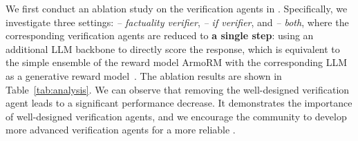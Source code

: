 \begin{table}
    \centering
    \small
    \caption{Experimental results (\%) of ablation study and the oracle setting. \textit{-- factuality verifier} and \textit{-- if verifier} refer to the reduction of the corresponding verification agent into a single LLM scorer.
    The results are the micro-averaged scores of all the corresponding subsets.}
    \label{tab:analysis}
\end{table}

We first conduct an ablation study on the verification agents in \ourmethod. Specifically, we investigate three settings: \textit{-- factuality verifier}, \textit{-- if verifier}, and \textit{-- both}, where the corresponding verification agents are reduced to \textbf{a single step}: using an additional LLM backbone to directly score the response, which is equivalent to the simple ensemble of the reward model ArmoRM with the corresponding LLM as a generative reward model~\citep{costereward2024}.
The ablation results are shown in Table~\ref{tab:analysis}. We can observe that removing the well-designed verification agent leads to a significant performance decrease. It demonstrates the importance of well-designed verification agents, and we encourage the community to develop more advanced verification agents for a more reliable \ourmethod.



